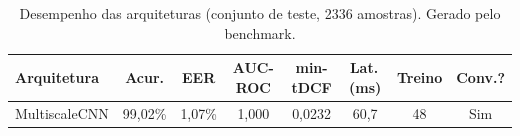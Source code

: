 \begin{table}[H]
\centering
\caption{Desempenho das arquiteturas (conjunto de teste, 2336 amostras). Gerado pelo benchmark.}
\label{tab:bench_resultados}
\small\singlespacing
\begin{tabular}{lccccccc}
\toprule
\textbf{Arquitetura} & \textbf{Acur.} & \textbf{EER} & \textbf{AUC-ROC} & \textbf{min-tDCF} & \textbf{Lat.\,(ms)} & \textbf{Treino} & \textbf{Conv.?} \\
\midrule
MultiscaleCNN & 99,02\% & 1,07\% & 1,000 & 0,0232 & 60,7 & 48 & \textcolor{successgreen}{Sim} \\
\bottomrule
\end{tabular}
\end{table}
